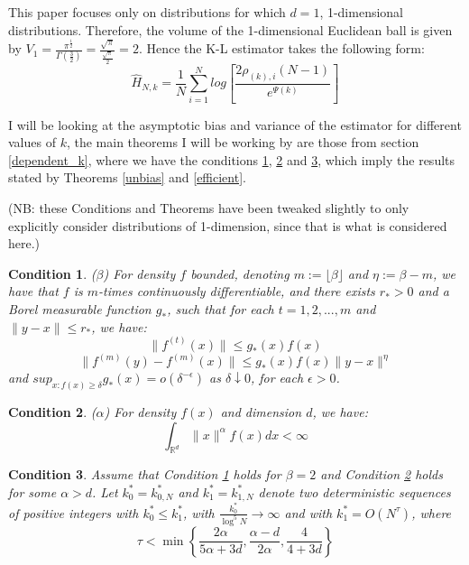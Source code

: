 \documentclass[12pt]{report}
\newtheorem{remark}{Condition}
\begin{document}
This paper focuses only on distributions for which $d =1$, 1-dimensional distributions. Therefore, the volume of the 1-dimensional Euclidean ball is given by $V_{1} = \frac{\pi^{\frac{1}{2}}}{\Gamma (\frac{3}{2})} = \frac{\sqrt{\pi}}{\frac{\sqrt{\pi}}{2}} = 2$. Hence the K-L estimator takes the following form:
\begin{equation} \label{KLest_d=1}
\hat{H}_{N, k} = \frac{1}{N} \sum_{i=1}^{N} log \left[ \frac{2\rho_{(k),i}(N-1)}{e^{\Psi(k)}} \right]
\end{equation}

I will be looking at the asymptotic bias and variance of the estimator for different values of $k$, the main theorems I will be working by are those from section \ref{dependent_k}, where we have the conditions \ref{A1}, \ref{A2} and \ref{A3}, which imply the results stated by Theorems \ref{unbias} and \ref{efficient}. 

(NB: these Conditions and Theorems have been tweaked slightly to only explicitly consider distributions of 1-dimension, since that is what is considered here.)

\begin{remark} ($\beta$) \label{A1}
For density $f$ bounded, denoting $m := \lfloor \beta \rfloor$ and $\eta := \beta -m$, we have that $f$ is $m$-times continuously differentiable, and there exists $r_{*} > 0$ and a Borel measurable function $g_{*}$, such that for each $t = 1, 2, ... , m$ and $\|y-x\| \leq r_{*}$, we have:
\begin{equation}
\| f^{(t)} (x) \| \leq g_{*}(x)f(x) \nonumber
\end{equation}
\begin{equation}
\| f^{(m)} (y) - f^{(m)} (x) \| \leq g_{*}(x)f(x) \|y-x\|^{\eta} \nonumber
\end{equation}
and $sup_{x:f(x)\geq \delta} g_{*}(x) = o(\delta^{-\epsilon})$ as $\delta \downarrow 0$, for each $\epsilon > 0$.
\end{remark}

\begin{remark} ($\alpha$) \label{A2}
For density $f(x)$ and dimension $d$, we have:
\begin{equation}
\int_{\mathbb{R}^{d}} \| x \|^{\alpha} f(x) dx < \infty \nonumber
\end{equation}
\end{remark}

\begin{remark} \label{A3}
Assume that Condition \ref{A1} holds for $\beta = 2$ and Condition \ref{A2} holds for some $\alpha > d$. Let $k_{0}^{*} = k_{0, N}^{*}$ and $k_{1}^{*} = k_{1, N}^{*}$ denote two deterministic sequences of positive integers with $k_{0}^{*} \leq k_{1}^{*}$, with $\frac{k_{0}^{*}}{\log^{5}{N}} \to \infty$ and with $k_{1}^{*} = O(N^{\tau})$, where
\begin{equation}
\tau < \min \left\{ \frac{2 \alpha}{5 \alpha + 3d} , \frac{\alpha - d}{2 \alpha} , \frac{4}{4 + 3d} \right\} \nonumber
\end{equation}
\end{remark}
\end{document}
